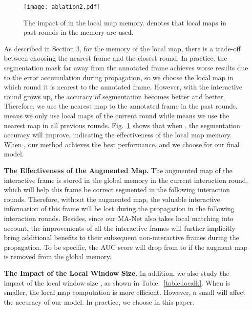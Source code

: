 \documentclass[10pt,twocolumn,letterpaper]{article}
\begin{document}
\begin{figure}[t]
\texttt{[image: ablation2.pdf]}
\centering
\caption{The impact of  in the local map memory.  denotes that local maps in past  rounds in the memory are used.}
\vspace{-1.5em}
\label{fig:ab2}
\end{figure}

As described in Section 3, for the memory of the local map, there is a trade-off between choosing the nearest frame and the closest round. In practice, the segmentation mask far away from the annotated frame achieves worse results due to the error accumulation during propagation, so we choose the local map in which round it is nearest to the annotated frame. However, with the interactive round grows up, the accuracy of segmentation becomes better and better.
Therefore, we use the nearest map to the annotated frame in the past  rounds.  means we only use local maps of the current round while  means we use the nearest map in all previous rounds. Fig.~\ref{fig:ab2} shows that when , the segmentation accuracy will improve, indicating the effectiveness of the local map memory. When , our method achieves the best performance, and we choose  for our final model.

\textbf{The Effectiveness of the Augmented Map. }
 The augmented map of the interactive frame is stored in the global memory in the current interaction round, which will help this frame be correct segmented in the following interaction rounds. Therefore, without the augmented map, the valuable interactive information of this frame will be lost during the propagation in the following interaction rounds.
Besides, since our MA-Net also takes local matching into account, the improvements of all the interactive frames will further implicitly bring additional benefits to their subsequent non-interactive frames during the propagation. To be specific, the AUC score will drop from  to  if the augment map is removed from the global memory.

\textbf{The Impact of the Local Window Size. }
In addition, we also study the impact of the local window size , as shown in Table.~\ref{table:localk}. When  is smaller, the local map computation is more efficient. However, a small  will affect the accuracy of our model. In practice, we choose  in this paper.
\end{document}
